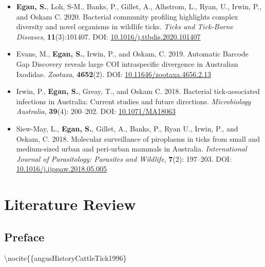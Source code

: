 \documentclass[a4paper, nobind]{templates/ociamthesis}
\renewcommand{\chaptermark}[1]{\markboth{\thechapter. #1}{\thechapter. #1}}
\begin{document}
\begin{itemize}
\item
  \textbf{Egan, S.}, Loh, S-M., Banks, P., Gillet, A., Alhstrom, L., Ryan, U., Irwin, P., and Oskam C. 2020. Bacterial community profiling highlights complex diversity and novel organisms in wildlife ticks. \emph{Ticks and Tick-Borne Diseases}, \textbf{11}(3):101407. DOI: \href{https://doi.org/10.1016/j.ttbdis.2020.101407}{10.1016/j.ttbdis.2020.101407}
\item
  Evans, M., \textbf{Egan, S.}, Irwin, P., and Oskam, C. 2019. Automatic Barcode Gap Discovery reveals large COI intraspecific divergence in Australian Ixodidae. \emph{Zootaxa}, \textbf{4652}(2). DOI: \href{https://doi.org/10.11646/zootaxa.4656.2.13}{10.11646/zootaxa.4656.2.13}
\item
  Irwin, P., \textbf{Egan, S.}, Greay, T., and Oskam C. 2018. Bacterial tick-associated infections in Australia: Current studies and future directions. \emph{Microbiology Australia}, \textbf{39}(4): 200--202. DOI: \href{https://doi.org/10.1071/MA18063}{10.1071/MA18063}
\item
  Siew-May, L., \textbf{Egan, S.}, Gillet, A., Banks, P., Ryan U., Irwin, P., and Oskam, C. 2018. Molecular surveillance of piroplasms in ticks from small and medium-sized urban and peri-urban mammals in Australia. \emph{International Journal of Parasitology: Parasites and Wildlife}, \textbf{7}(2): 197--203. DOI: \href{https://doi.org/10.1016/j.ijppaw.2018.05.005}{10.1016/j.ijppaw.2018.05.005}
\end{itemize}

\hypertarget{litrev}{%
\chapter{Literature Review}\label{litrev}}

\chaptermark{Review}

\minitoc 

\hypertarget{preface}{%
\section*{Preface}\label{preface}}

\nocite{guglielmoneIxodidaeAcariIxodoidea2020}
\nocite{lohIdentificationTheileriaFuliginosalike2018}
\nocite{cooperDetectionCoxiellaBurnetii2013} \nocite{greayIlluminatingBacterialMicrobiome2021} \nocite{brodyCaseTickTyphus1946} \nocite{popeIsolationRickettsiaResembling1955} \nocite{owenDetectionIdentificationNovel2006} \nocite{owenPotentiallyPathogenicSpotted2006} \nocite{sentausaGenomeSequenceRickettsia2013} \nocite{liHighPrevalenceRickettsia2010} \nocite{abdadRickettsiaGravesiiSp2017} \nocite{owenDetectionCharacterisationRickettsiae2007} \nocite{bennettCoxiellaBurnetiiWestern2011}
\nocite{jefferiesTwoSpeciesCanine2003}
\nocite{jonssonProductivityHealthEffects2008}
\textbackslash nocite\{\{angusHistoryCattleTick1996\}
\end{document}
